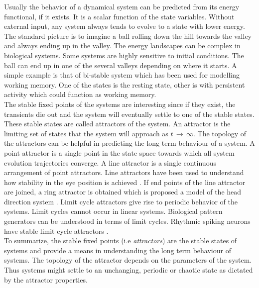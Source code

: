 Usually the behavior of a dynamical system can be predicted from its energy functional, if it exists. It is a scalar function of the state variables. Without external input, any system always tends to evolve to a state with lower energy. The standard picture is to imagine a ball rolling down the hill towards the valley and always ending up in the valley. The energy landscapes can be complex in biological systems. Some systems are highly sensitive to initial conditions. The ball can end up in one of the several valleys depending on where it starts. A simple example is that of bi-stable system which has been used for modelling working memory. One of the states is the resting state, other is with persistent activity which could function as working memory.\\
The stable fixed points of the systems are interesting since if they exist, the transients die out and the system will eventually settle to one of the stable states. These stable states are called attractors of the system. An attractor is the limiting set of states that the system will approach as $t\, \rightarrow \, \infty $. The topology of the attractors can be helpful in predicting the long term behaviour of a system. A point attractor is a single point in the state space towards which all system evolution trajectories converge. A line attractor is a single continuous arrangement of point attractors. Line attractors have been used to understand how stability in the eye position is achieved \cite{Seung1996}. If end points of the line attractor are joined, a ring attractor is obtained which is proposed a model of the head direction system \cite{Zhang1996}. Limit cycle attractors give rise to periodic behavior of the systems. Limit cycles cannot occur in linear systems. Biological pattern generators can be understood in terms of limit cycles. Rhythmic spiking neurons have stable limit cycle attractors \cite{Izhikevich2007}.\\
To summarize, the stable fixed points (i.e \emph{attractors}) are the stable states of systems and provide a means in understanding the long term behaviour of systems. The topology of the attractor depends on the parameters of the system. Thus systems might settle to an unchanging, periodic or chaotic state as dictated by the attractor properties. 


